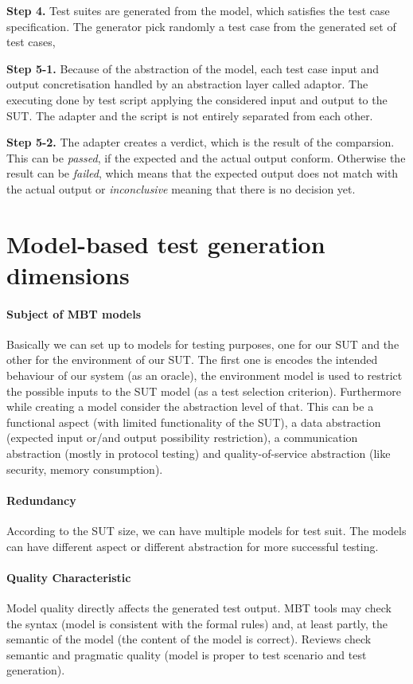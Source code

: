 \textbf{Step 4.}
Test suites are generated from the model, which satisfies the test case specification. The generator pick randomly a test case from the generated set of test cases, 

\textbf{Step 5-1.}
Because of the abstraction of the model, each test case input and output concretisation handled by an abstraction layer called adaptor. The executing done by test script applying the considered input and output to the SUT. The adapter and the script is not entirely separated from each other.

\textbf{Step 5-2.}
The adapter creates a verdict, which is the result of the comparsion. This can be \textit{passed}, if the expected and the actual output conform. Otherwise the result can be \textit{failed}, which means that the expected output does not match with the actual output or \textit{inconclusive} meaning that there is no decision yet.

\section{Model-based test generation dimensions}
\paragraph{Subject of MBT models}
Basically we can set up to models for testing purposes, one for our SUT and the other for the environment of our SUT. The first one is encodes the intended behaviour of our system (as an oracle), the environment model is used to restrict the possible inputs to the SUT model (as a test selection criterion). Furthermore while creating a model consider the abstraction level of that. This can be a functional aspect (with limited functionality of the SUT), a data abstraction (expected input or/and output possibility restriction), a communication abstraction (mostly in protocol testing) and quality-of-service abstraction (like security, memory consumption).

\paragraph{Redundancy}
According to the SUT size, we can have multiple models for test suit. The models can have different aspect or different abstraction for more successful testing.

\paragraph{Quality Characteristic}
Model quality directly affects the generated test output. MBT tools may check the syntax (model is consistent with the formal rules) and, at least partly, the semantic of the model (the content of the model is correct). Reviews check semantic and pragmatic quality (model is proper to test scenario and test generation).

